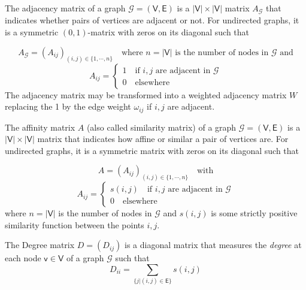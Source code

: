 \begin{definition}
	The adjacency matrix of a graph $\mathcal{G}=(\mathsf{V}, \mathsf{E})$ is a $|\mathsf{V}| \times |\mathsf{V}|$ matrix $A_{\mathcal{G}}$ that indicates whether pairs of vertices are adjacent or not. For undirected graphs, it is a symmetric $(0,1)$-matrix with zeros on its diagonal such that 
	
	\begin{equation}	
		A_{\mathcal{G}} = (A_{ij})_{(i, j)\in \{1,\cdots, n\}}  \quad \text{where $n=|\mathsf{V}|$ is the number of nodes in $\mathcal{G}$ and} \nonumber 		
	\end{equation}
	\begin{equation}	
		A_{ij}= 
		\begin{cases}
			1 \quad \text{if $i, j$ are adjacent in $\mathcal{G}$} \\
			0 \quad \text{elsewhere}
		\end{cases}		\nonumber		
	\end{equation}
	The adjacency matrix may be transformed into a weighted adjacency matrix $W$ replacing the 1 by the edge weight $\omega_{ij}$ if $i, j$ are adjacent.
\end{definition}

\begin{definition}
	The affinity matrix $A$ (also called similarity matrix) of a graph $\mathcal{G}=(\mathsf{V}, \mathsf{E})$ is a $|\mathsf{V}| \times |\mathsf{V}|$ matrix that indicates how affine or similar a pair of vertices are. For undirected graphs, it is a symmetric matrix with zeros on its diagonal such that 
	
	\begin{equation}	
		A = (A_{ij})_{(i, j)\in \{1,\cdots, n\}}  \quad \text{with}  \nonumber 		
	\end{equation}
	\begin{equation}	
		A_{ij}= 
		\begin{cases}
			s(i,j) \quad \text{if $i, j$ are adjacent in $\mathcal{G}$} \\
			0 \quad \text{elsewhere}
		\end{cases}	 \nonumber		
	\end{equation}
where $n=|\mathsf{V}|$ is the number of nodes in $\mathcal{G}$ and $s(i,j)$ is some strictly positive similarity function between the points $i,j$.
\end{definition}

\begin{definition}
	The Degree matrix $D=(D_{ij})$ is a diagonal matrix that measures the \textit{degree} at each node $\mathsf{v} \in \mathsf{V}$ of a graph $\mathcal{G}$ such that 
	\begin{equation}	
		D_{ii} =  \underset{\{j|(i,j)\in \mathsf{E}\}}{\sum}  s(i,j)  \nonumber 		
	\end{equation}	
\end{definition}

